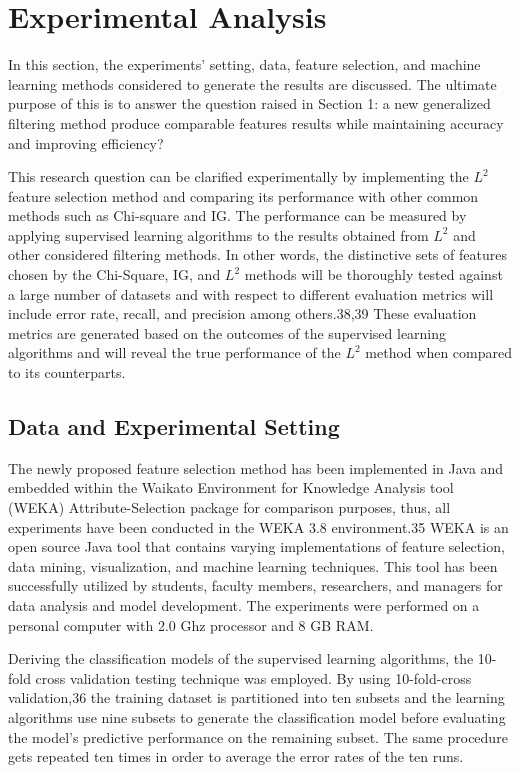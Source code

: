 \documentclass[review]{elsarticle}
\begin{document}
\section{Experimental Analysis }

In this section, the experiments’ setting, data, feature selection, and machine learning methods considered to generate the results are discussed. The ultimate purpose of this is to answer the question raised in Section 1: a new generalized filtering method produce comparable features results while maintaining accuracy and improving efficiency?

This research question can be clarified experimentally by implementing the $ L^2 $ feature selection method and comparing its performance with other common methods such as Chi-square and IG. The performance can be measured by applying supervised learning algorithms to the results obtained from $ L^2 $ and other considered filtering methods. In other words, the distinctive sets of features chosen by the Chi-Square, IG, and $ L^2 $ methods will be thoroughly tested against a large number of datasets and with respect to different evaluation metrics will include error rate, recall, and precision among others.38,39 These evaluation metrics are generated based on the outcomes of the supervised learning algorithms and will reveal the true performance of the $ L^2 $ method when compared to its counterparts.

\subsection{Data and Experimental Setting }

The newly proposed feature selection method has been implemented in Java and embedded within the Waikato Environment for Knowledge Analysis tool (WEKA) Attribute-Selection package for comparison purposes, thus, all experiments have been conducted in the WEKA 3.8 environment.35  WEKA is an open source Java tool that contains varying implementations of feature selection, data mining, visualization, and machine learning techniques. This tool has been successfully utilized by students, faculty members, researchers, and managers for data analysis and model development. The experiments were performed on a personal computer with 2.0 Ghz processor and 8 GB RAM. 

Deriving the classification models of the supervised learning algorithms, the 10-fold cross validation testing technique was employed. By using 10-fold-cross validation,36  the training dataset is partitioned into ten subsets and the learning algorithms use nine subsets to generate the classification model before evaluating the model’s predictive performance on the remaining subset. The same procedure gets repeated ten times in order to average the error rates of the ten runs.
\end{document}
